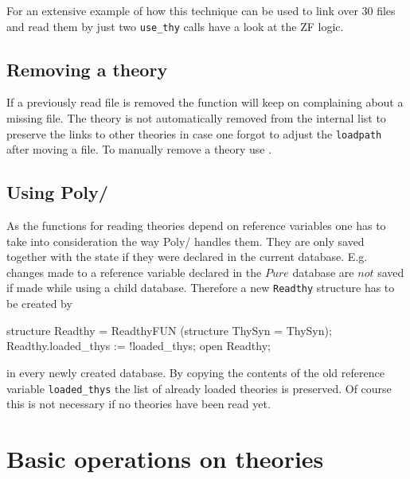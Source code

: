For an extensive example of how this technique can be used to link over 30
files and read them by just two {\tt use_thy} calls have a look at the ZF
logic.


\subsection{Removing a theory}

If a previously read file is removed the  function will keep
on complaining about a missing file.  The theory is not automatically removed
from the internal list to preserve the links to other theories in case one
forgot to adjust the {\tt loadpath} after moving a file.  To manually remove a
theory use .


\subsection{Using Poly/\ML}

As the functions for reading theories depend on reference variables one has to
take into consideration the way Poly/\ML{} handles them.  They are only saved
together with the state if they were declared in the current database.  E.g.
changes made to a reference variable declared in the $Pure$ database are $not$
saved if made while using a child database.  Therefore a new {\tt Readthy}
structure has to be created by
\begin{ttbox}
structure Readthy = ReadthyFUN (structure ThySyn = ThySyn);
Readthy.loaded_thys := !loaded_thys;
open Readthy;
\end{ttbox}
in every newly created database.  By copying the contents of the old reference
variable \verb$loaded_thys$ the list of already loaded theories is preserved.
Of course this is not necessary if no theories have been read yet.


\section{Basic operations on theories}
